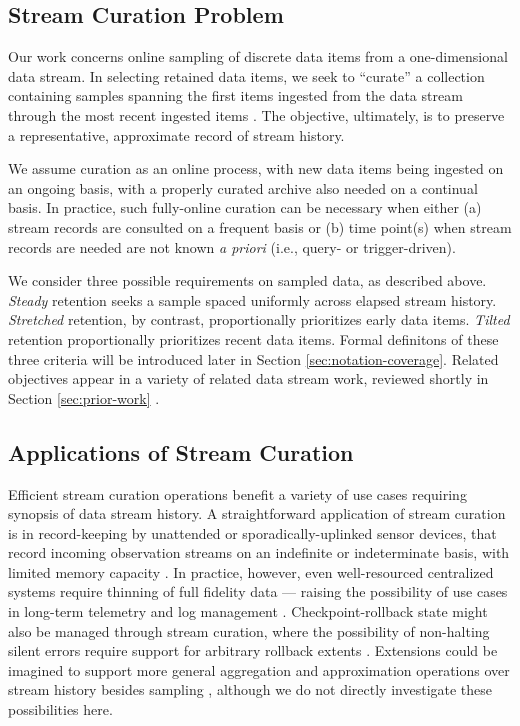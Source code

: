 \subsection{Stream Curation Problem}

Our work concerns online sampling of discrete data items from a one-dimensional data stream.
In selecting retained data items, we seek to ``curate'' a collection containing samples spanning the first items ingested from the data stream through the most recent ingested items \citep{moreno2024algorithms}.
The objective, ultimately, is to preserve a representative, approximate record of stream history.

We assume curation as an online process, with new data items being ingested on an ongoing basis, with a properly curated archive also needed on a continual basis.
In practice, such fully-online curation can be necessary when either (a) stream records are consulted on a frequent basis or (b) time point(s) when stream records are needed are not known \textit{a priori} (i.e., query- or trigger-driven).

We consider three possible requirements on sampled data, as described above.
\textit{{Steady}} retention seeks a sample spaced uniformly across elapsed stream history.
\textit{{Stretched}} retention, by contrast, proportionally prioritizes early data items.
\textit{{Tilted}} retention proportionally prioritizes recent data items.
Formal definitons of these three criteria will be introduced later in Section \ref{sec:notation-coverage}.
Related objectives appear in a variety of related data stream work, reviewed shortly in Section \ref{sec:prior-work} \citep{aggarwal2003framework,han2005stream}.


\subsection{Applications of Stream Curation}

Efficient stream curation operations benefit a variety of use cases requiring synopsis of data stream history.
A straightforward application of stream curation is in record-keeping by unattended or sporadically-uplinked sensor devices, that record incoming observation streams on an indefinite or indeterminate basis, with limited memory capacity \citep{jain2022survey}.
In practice, however, even well-resourced centralized systems require thinning of full fidelity data --- raising the possibility of use cases in long-term telemetry and log management \citep{kent2006guide,miebach2002hubble}.
Checkpoint-rollback state might also be managed through stream curation, where the possibility of non-halting silent errors require support for arbitrary rollback extents \citep{aupy2013combination}.
Extensions could be imagined to support more general aggregation and approximation operations over stream history besides sampling \citep{schoellhammer2024lightweight}, although we do not directly investigate these possibilities here.

